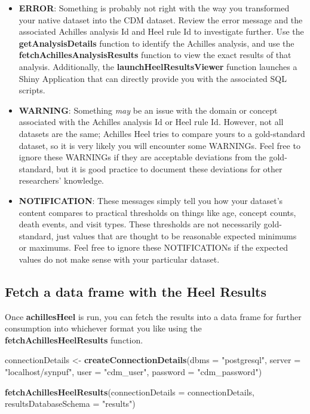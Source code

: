 \documentclass[]{article}
\newenvironment{Shaded}{\begin{snugshade}}{\end{snugshade}}
\newcommand{\KeywordTok}[1]{\textcolor[rgb]{0.13,0.29,0.53}{\textbf{#1}}}
\newcommand{\DataTypeTok}[1]{\textcolor[rgb]{0.13,0.29,0.53}{#1}}
\newcommand{\StringTok}[1]{\textcolor[rgb]{0.31,0.60,0.02}{#1}}
\newcommand{\NormalTok}[1]{#1}
\providecommand{\tightlist}{%
  \setlength{\itemsep}{0pt}\setlength{\parskip}{0pt}}
\begin{document}
\begin{itemize}
\tightlist
\item
  \textbf{ERROR}: Something is probably not right with the way you
  transformed your native dataset into the CDM dataset. Review the error
  message and the associated Achilles analysis Id and Heel rule Id to
  investigate further. Use the \textbf{getAnalysisDetails} function to
  identify the Achilles analysis, and use the
  \textbf{fetchAchillesAnalysisResults} function to view the exact
  results of that analysis. Additionally, the
  \textbf{launchHeelResultsViewer} function launches a Shiny Application
  that can directly provide you with the associated SQL scripts.
\item
  \textbf{WARNING}: Something \emph{may} be an issue with the domain or
  concept associated with the Achilles analysis Id or Heel rule Id.
  However, not all datasets are the same; Achilles Heel tries to compare
  yours to a gold-standard dataset, so it is very likely you will
  encounter some WARNINGs. Feel free to ignore these WARNINGs if they
  are acceptable deviations from the gold-standard, but it is good
  practice to document these deviations for other researchers'
  knowledge.
\item
  \textbf{NOTIFICATION}: These messages simply tell you how your
  dataset's content compares to practical thresholds on things like age,
  concept counts, death events, and visit types. These thresholds are
  not necessarily gold-standard, just values that are thought to be
  reasonable expected minimums or maximums. Feel free to ignore these
  NOTIFICATIONs if the expected values do not make sense with your
  particular dataset.
\end{itemize}

\subsection{Fetch a data frame with the Heel
Results}\label{fetch-a-data-frame-with-the-heel-results}

Once \textbf{achillesHeel} is run, you can fetch the results into a data
frame for further consumption into whichever format you like using the
\textbf{fetchAchillesHeelResults} function.

\begin{Shaded}
\begin{Highlighting}[]
\NormalTok{connectionDetails <-}\StringTok{ }\KeywordTok{createConnectionDetails}\NormalTok{(}\DataTypeTok{dbms =} \StringTok{"postgresql"}\NormalTok{, }
                                             \DataTypeTok{server =} \StringTok{"localhost/synpuf"}\NormalTok{, }
                                             \DataTypeTok{user =} \StringTok{"cdm_user"}\NormalTok{, }
                                             \DataTypeTok{password =} \StringTok{"cdm_password"}\NormalTok{)}

\KeywordTok{fetchAchillesHeelResults}\NormalTok{(}\DataTypeTok{connectionDetails =}\NormalTok{ connectionDetails, }
                         \DataTypeTok{resultsDatabaseSchema =} \StringTok{"results"}\NormalTok{)}
\end{Highlighting}
\end{Shaded}
\end{document}

